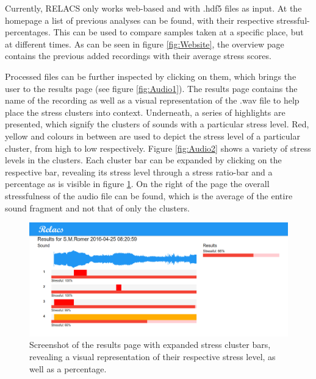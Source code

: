 \documentclass[a4paper]{article}
\begin{document}
Currently, RELACS only works web-based and with .hdf5 files as input. At the homepage a list of previous analyses can be found, with their respective stressful-percentages. This can be used to compare samples taken at a specific place, but at different times. As can be seen in figure \ref{fig:Website}, the overview page contains the previous added recordings with their average stress scores.

Processed files can be further inspected by clicking on them, which brings the user to the results page (see figure \ref{fig:Audio1}). The results page contains the name of the recording as well as a visual representation of the .wav file to help place the stress clusters into context. Underneath, a series of highlights are presented, which signify the clusters of sounds with a particular stress level. Red, yellow and colours in between are used to depict the stress level of a particular cluster, from high to low respectively. Figure \ref{fig:Audio2} shows a variety of stress levels in the clusters. Each cluster bar can be expanded by clicking on the respective bar, revealing its stress level through a stress ratio-bar and a percentage as is visible in figure \ref{fig:Audio1Expand}. On the right of the page the overall stressfulness of the audio file can be found, which is the average of the entire sound fragment and not that of only the clusters.

\begin{figure}[h]
\centering
\includegraphics[width=0.9\linewidth]{./Audio1ResultsExpand}
\caption{Screenshot of the results page with expanded stress cluster bars, revealing a visual representation of their respective stress level, as well as a percentage.}
\label{fig:Audio1Expand}
\end{figure}
\end{document}
